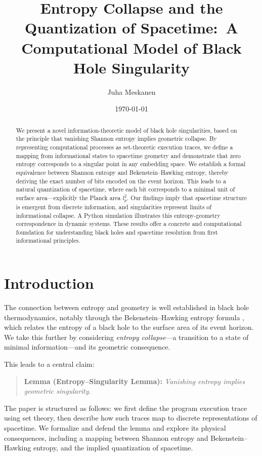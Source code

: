 \documentclass[11pt]{article}
\title{Entropy Collapse and the Quantization of Spacetime:\ A Computational Model of Black Hole Singularity}
\author{Juha Meskanen}
\date{\today}
\begin{document}
\maketitle

\begin{abstract}
  We present a novel information-theoretic model of black hole singularities, based on the principle that vanishing Shannon
  entropy implies geometric collapse. By representing computational processes as set-theoretic execution traces, we define a mapping from informational states to spacetime geometry and demonstrate that zero entropy corresponds to a singular point in any embedding space. We establish a formal equivalence between Shannon entropy and Bekenstein--Hawking entropy, thereby deriving the exact number of bits encoded on the event horizon. This leads to a natural quantization of spacetime, where each bit corresponds to a minimal unit of surface area---explicitly the Planck area $l_p^2$. Our findings imply that spacetime structure is emergent from discrete information, and singularities represent limits of informational collapse. A Python simulation illustrates this entropy-geometry correspondence in dynamic systems. These results offer a concrete and computational foundation for understanding black holes and spacetime resolution from first informational principles.
\end{abstract}

\section{Introduction}

The connection between entropy and geometry is well established in black hole thermodynamics, notably through the Bekenstein--Hawking entropy formula \cite{Bekenstein1973,Hawking1975}, which relates the entropy of a black hole to the surface area of its event horizon. We take this further by considering \emph{entropy collapse}---a transition to a state of minimal information---and its geometric consequence.

This leads to a central claim:

\begin{quote}
  \textbf{Lemma (Entropy--Singularity Lemma):} \emph{Vanishing entropy implies geometric singularity.}
\end{quote}

The paper is structured as follows: we first define the program execution trace using set theory, then describe how such traces map to discrete representations of spacetime. We formalize and defend the lemma and explore its physical consequences, including a mapping between Shannon entropy and Bekenstein--Hawking entropy, and the implied quantization of spacetime.
\end{document}
